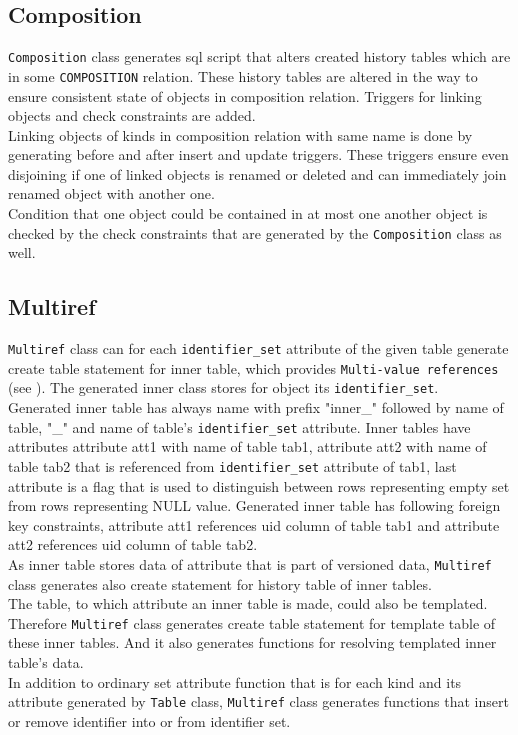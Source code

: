 \documentclass[deska]{subfiles}
\begin{document}
\subsection{Composition}
{\tt Composition} class generates sql script that alters created history tables which are in some {\tt COMPOSITION} relation. These history tables are altered in the way to ensure consistent state of objects in composition relation. Triggers for linking objects and check constraints are added.\\
Linking objects of kinds in composition relation with same name is done by generating before and after insert and update triggers. These triggers ensure even disjoining if one of linked objects is renamed or deleted and can immediately join renamed object with another one.\\
Condition that one object could be contained in at most one another object is checked by the check constraints that are generated by the {\tt Composition} class as well.

\subsection{Multiref}
{\tt Multiref} class can for each {\tt identifier\_set} attribute of the given table generate create table statement for inner table, which provides {\tt Multi-value references} (see ). The generated inner class stores for object its {\tt identifier\_set}.\\
Generated inner table has always name with prefix "inner\_" followed by name of table, "\_" and name of table's {\tt identifier\_set} attribute. Inner tables have attributes attribute att1 with name of table tab1, attribute att2 with name of table tab2 that is referenced from {\tt identifier\_set} attribute of tab1, last attribute is a flag that is used to distinguish between rows representing empty set from rows representing NULL value. Generated inner table has following foreign key constraints, attribute att1 references uid column of table tab1 and attribute att2 references uid column of table tab2.\\
As inner table stores data of attribute that is part of versioned data, {\tt Multiref} class generates also create statement for history table of inner tables.\\ 
The table, to which attribute an inner table is made, could also be templated. Therefore {\tt Multiref} class generates create table statement for template table of these inner tables. And it also generates functions for resolving templated inner table's data.\\
In addition to ordinary set attribute function that is for each kind and its attribute generated by {\tt Table} class, {\tt Multiref} class generates functions that insert or remove identifier into or from identifier set.
\end{document}
